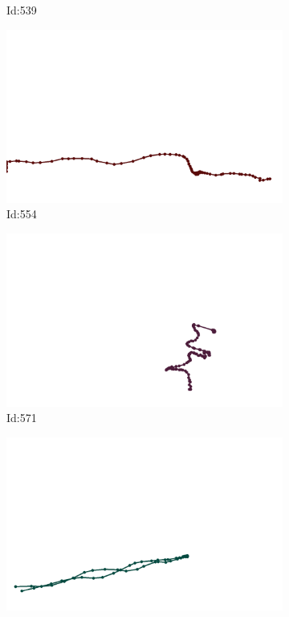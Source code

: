 \documentclass[12pt,twoside]{report}
\begin{document}
\begin{figure}
\begin{subfigure}[b]{0.20\textwidth}
\caption{Id:539}
\end{subfigure}
\begin{subfigure}[b]{0.20\textwidth}
\centering
\includegraphics[width=\textwidth]{../trajectories/554.png}
\caption{Id:554}
\end{subfigure}
\begin{subfigure}[b]{0.20\textwidth}
\centering
\includegraphics[width=\textwidth]{../trajectories/571.png}
\caption{Id:571}
\end{subfigure}
\begin{subfigure}[b]{0.20\textwidth}
\centering
\includegraphics[width=\textwidth]{../trajectories/657.png}

\end{subfigure}
\end{figure}
\end{document}
